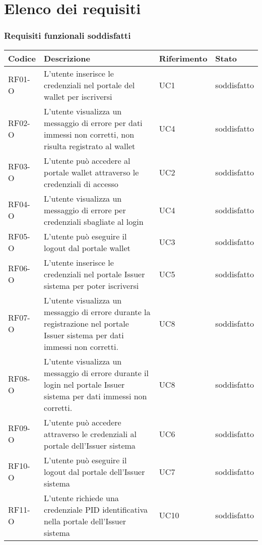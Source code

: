 \section{Elenco dei requisiti}
\subsubsection*{Requisiti funzionali soddisfatti} %
    \begin{longtable}{|p{}|p{}|p{}|p{}|}
        \hline
        \textbf{Codice} & \textbf{Descrizione} & \textbf{Riferimento} & \textbf{Stato}\\
        \hline
        RF01-O & L'utente inserisce le credenziali nel portale del wallet per iscriversi & UC1 & soddisfatto\\
        RF02-O & L'utente visualizza un messaggio di errore per dati immessi non corretti, non risulta registrato al wallet & UC4& soddisfatto\\
        RF03-O & L'utente può accedere al portale wallet attraverso le credenziali di accesso & UC2& soddisfatto\\
        RF04-O & L'utente visualizza un messaggio di errore per credenziali sbagliate al login & UC4& soddisfatto\\ 
        RF05-O & L'utente può eseguire il logout dal portale wallet & UC3& soddisfatto\\
        RF06-O & L'utente inserisce le credenziali nel portale Issuer sistema per poter iscriversi & UC5& soddisfatto\\
        RF07-O & L'utente visualizza un messaggio di errore durante la registrazione nel portale Issuer sistema per dati immessi non corretti. & UC8& soddisfatto\\
        RF08-O & L'utente visualizza un messaggio di errore durante il login nel portale Issuer sistema per dati immessi non corretti. & UC8& soddisfatto\\
        RF09-O & L'utente può accedere attraverso le credenziali al portale dell'Issuer sistema & UC6& soddisfatto\\
        RF10-O & L'utente può eseguire il logout dal portale dell'Issuer sistema & UC7& soddisfatto\\
        RF11-O & L'utente richiede una credenziale PID identificativa nella portale dell'Issuer sistema & UC10& soddisfatto\\

\end{longtable}
